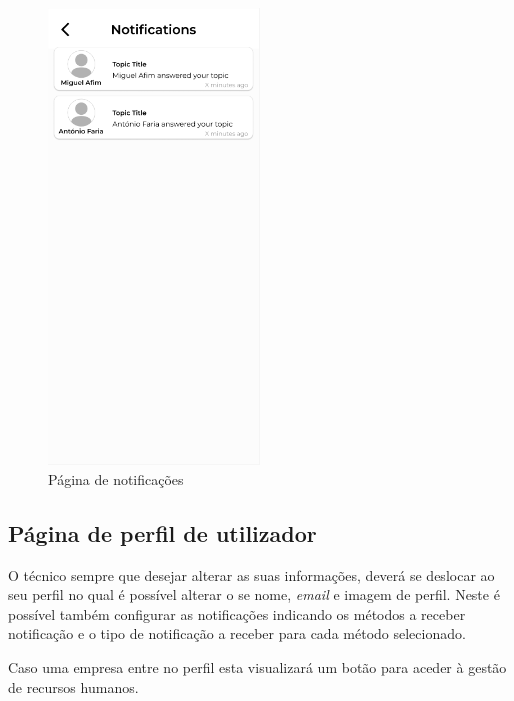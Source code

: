\begin{figure}[htb]
    \centering
    \includegraphics[width=0.5\textwidth]{images/mockups/notifications.png}
    \caption{Página de notificações}
    \label{fig:29}
\end{figure}

\newpage

\subsection{Página de perfil de utilizador}

O técnico sempre que desejar alterar as suas informações, deverá se deslocar ao seu perfil no qual é possível
alterar o se nome, \textit{email} e imagem de perfil. Neste é possível também configurar as notificações indicando os métodos
a receber notificação e o tipo de notificação a receber para cada método selecionado.

Caso uma empresa entre no perfil esta visualizará um botão para aceder à gestão de recursos humanos.

